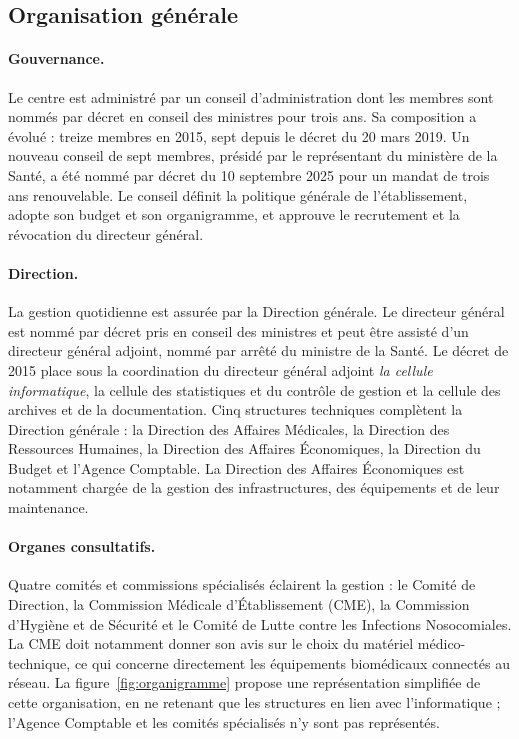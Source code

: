 \subsection{Organisation générale}

\paragraph{Gouvernance.} Le centre est administré par un conseil d'administration dont les membres sont nommés par décret en conseil des ministres pour trois ans\cite{decret2015}. Sa composition a évolué : treize membres en 2015\cite{decret2015}, sept depuis le décret du 20 mars 2019\cite{decret2019}. Un nouveau conseil de sept membres, présidé par le représentant du ministère de la Santé, a été nommé par décret du 10 septembre 2025 pour un mandat de trois ans renouvelable\cite{ca2025nom}. Le conseil définit la politique générale de l'établissement, adopte son budget et son organigramme, et approuve le recrutement et la révocation du directeur général\cite{ca2025}.

\paragraph{Direction.} La gestion quotidienne est assurée par la Direction générale. Le directeur général est nommé par décret pris en conseil des ministres et peut être assisté d'un directeur général adjoint, nommé par arrêté du ministre de la Santé\cite{decret2015}. Le décret de 2015 place sous la coordination du directeur général adjoint \emph{la cellule informatique}, la cellule des statistiques et du contrôle de gestion et la cellule des archives et de la documentation\cite{decret2015}. Cinq structures techniques complètent la Direction générale : la Direction des Affaires Médicales, la Direction des Ressources Humaines, la Direction des Affaires Économiques, la Direction du Budget et l'Agence Comptable\cite{decret2015}. La Direction des Affaires Économiques est notamment chargée de la gestion des infrastructures, des équipements et de leur maintenance\cite{decret2015}.

\paragraph{Organes consultatifs.} Quatre comités et commissions spécialisés éclairent la gestion : le Comité de Direction, la Commission Médicale d'Établissement (CME), la Commission d'Hygiène et de Sécurité et le Comité de Lutte contre les Infections Nosocomiales\cite{decret2015}. La CME doit notamment donner son avis sur le choix du matériel médico-technique, ce qui concerne directement les équipements biomédicaux connectés au réseau. La figure~\ref{fig:organigramme} propose une représentation simplifiée de cette organisation, en ne retenant que les structures en lien avec l'informatique ; l'Agence Comptable et les comités spécialisés n'y sont pas représentés.

